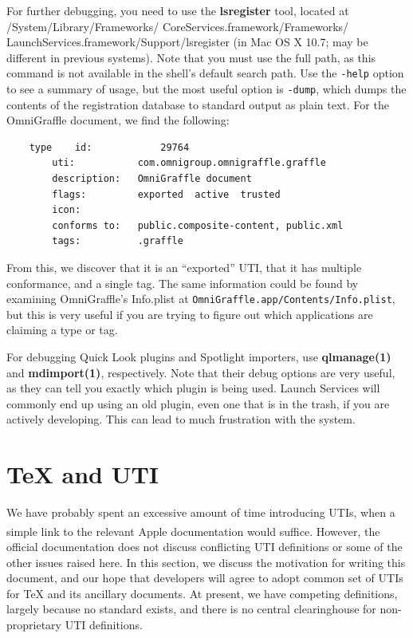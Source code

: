 \documentclass[11pt]{article}
\newcommand*{\apple}{Apple\textsuperscript{\textregistered}\xspace}
\begin{document}
For further debugging, you need to use the \textbf{lsregister} tool, located at
/System/Library/Frameworks/\discretionary{}{}{}%
CoreServices.framework/Frameworks/\discretionary{}{}{}%
LaunchServices.framework/Support/lsregister 
(in Mac OS X 10.7; may be different in previous systems). Note that you
must use the full path, as this command is not available in the shell's
default search path.
Use the \texttt{-help} option to see a summary of
usage, but the most useful option is \texttt{-dump}, which dumps the contents
of the registration database to standard output as plain text. For the
OmniGraffle document, we find the following:
\begin{verbatim}
	type	id:            29764
		uti:           com.omnigroup.omnigraffle.graffle
		description:   OmniGraffle document
		flags:         exported  active  trusted  
		icon:          
		conforms to:   public.composite-content, public.xml
		tags:          .graffle
\end{verbatim}
From this, we discover that it is an “exported” UTI, that it has
multiple conformance, and a single tag. The same information
could be found by examining OmniGraffle's Info.plist at
\texttt{OmniGraffle.app/Contents/Info.plist}, but this is very useful
if you are trying to figure out which applications are claiming a type
or tag.

For debugging Quick Look plugins and Spotlight importers, use
\textbf{qlmanage(1)} and \textbf{mdimport(1)}, respectively. Note that
their debug options are very useful, as they can tell you exactly which
plugin is being used. Launch Services will commonly end up using an
old plugin, even one that is in the trash, if you are actively developing.
This can lead to much frustration with the system.

\section{\TeX{} and UTI}
We have probably spent an excessive amount of time introducing UTIs, when
a simple link to the relevant \apple documentation would suffice. However,
the official documentation does not discuss conflicting UTI definitions or
some of the other issues raised here. In this section, we discuss the
motivation for writing this document, and our hope that developers will
agree to adopt common set of UTIs for \TeX{} and its ancillary documents.
At present, we have competing definitions, largely because no standard 
exists, and there is no central clearinghouse for non-proprietary UTI 
definitions.
\end{document}
